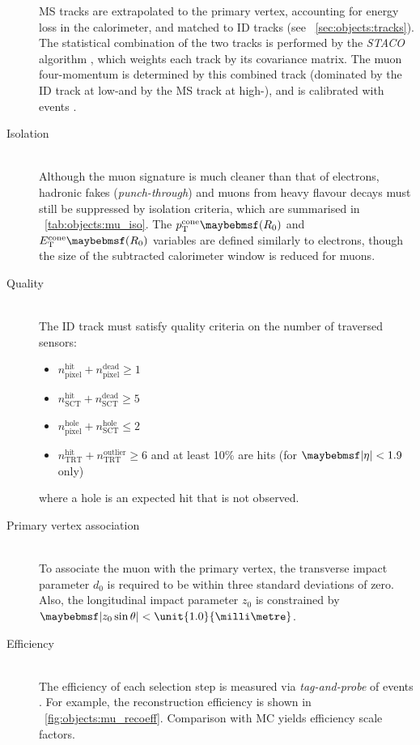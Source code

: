 \begin{description}
	\ac{MS} tracks are extrapolated to the primary vertex, accounting for energy loss in 
	the calorimeter, and matched to \ac{ID} tracks (see 
	\Section~\ref{sec:objects:tracks}). The statistical combination of the two 
	tracks is performed by the \textit{STACO} algorithm \cite{Muons:algorithms}, which
	weights each track by its covariance matrix. The muon four-momentum is determined 
	by this combined track (dominated by the \ac{ID} track at low-\pt and by the 
	\ac{MS} track at high-\pt), and is calibrated with \HepProcess{\PZ \HepTo \Pmu\Pmu}
	events \cite{Muons:2012}.
\item[Isolation] \hfill \\
	Although the muon signature is much cleaner than that of electrons, hadronic fakes 
	(\textit{punch-through}) and muons from heavy flavour decays must still be suppressed 
	by isolation criteria, which are summarised in \Table~\ref{tab:objects:mu_iso}. The 
	$p_{\text{T}}^{\text{cone}}\parenths{R_0}$ and 
	$E_{\text{T}}^{\text{cone}}\parenths{R_0}$ variables are defined similarly to 
	electrons, though the size of the subtracted calorimeter window is reduced for muons.
\item[Quality] \hfill \\
	The \ac{ID} track must satisfy quality criteria on the number of traversed sensors:
	\begin{itemize}[noitemsep,nolistsep]
		\item $n_{\text{pixel}}^{\text{hit}} + n_{\text{pixel}}^{\text{dead}} \geq 1$
		\item $n_{\text{SCT}}^{\text{hit}} + n_{\text{SCT}}^{\text{dead}} \geq 5$
		\item $n_{\text{pixel}}^{\text{hole}} + n_{\text{SCT}}^{\text{hole}} \leq 2$
		\item $n_{\text{TRT}}^{\text{hit}} + n_{\text{TRT}}^{\text{outlier}} \geq 6$ and 
		at least 10\% are hits (for $\mods{\eta} < 1.9$ only)
	\end{itemize}
	where a hole is an expected hit that is not observed.
\item[Primary vertex association] \hfill \\
	To associate the muon with the primary vertex, the transverse impact parameter $d_0$ 
	is required to be within three standard deviations of zero. Also, the longitudinal 
	impact parameter $z_0$ is constrained by $\mods{z_0 \sin\theta} < 
	\unit{1.0}{\milli\metre}$.
\item[Efficiency] \hfill \\
	The efficiency of each selection step is measured via \textit{tag-and-probe} of 
	\HepProcess{\PZ \HepTo \Pmu\Pmu} events \cite{Muons:2012}. For example, the 
	reconstruction efficiency is shown in \Figure~\ref{fig:objects:mu_recoeff}. 
	Comparison with MC yields efficiency scale factors.
\end{description}


